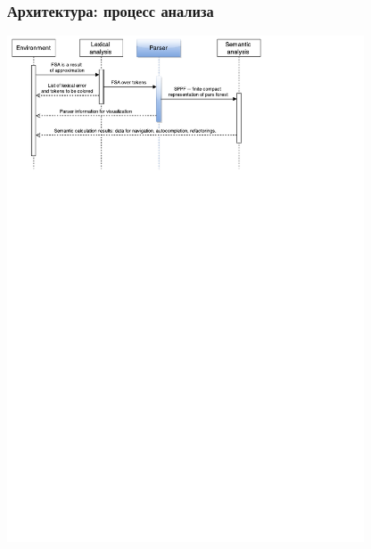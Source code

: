 \documentclass{beamer}
\begin{document}
\begin{frame}
    \transwipe[direction=90]
    \frametitle{Архитектура: процесс анализа}
    \begin{center}
        \includegraphics[width=300pt]{pictures/Seq.pdf}
    \end{center}
\end{frame}
\end{document}
